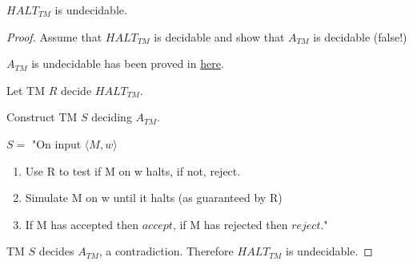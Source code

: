 \begin{theorem}
    \(HALT_{TM}\) is undecidable. 
\end{theorem}
\begin{proof}
    Assume that \(HALT_{TM}\) is decidable and show that \(A_{TM}\) is decidable (false!)  

    \(A_{TM} \) is undecidable has been proved in \hyperref[theorem: undecidable language]{here}.

    Let TM \(R\) decide \(HALT_{TM}\).
    
    Construct TM \(S\) deciding \(A_{TM}\).  

    \(S = \) "On input \(\langle M, w \rangle\) 
        \begin{enumerate}
            \item Use R to test if M on w halts, if not, reject.
            \item Simulate M on w until it halts (as guaranteed by R)
            \item If M has accepted then \(accept\), if M has rejected then \(reject\)."
        \end{enumerate} 

    TM \(S\) decides \(A_{TM}\), a contradiction. Therefore \(HALT_{TM}\) is undecidable.   
\end{proof}


